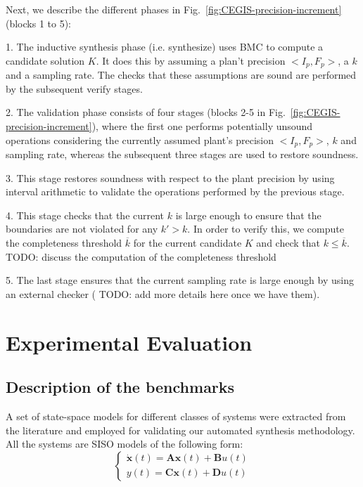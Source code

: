 \documentclass[runningheads,a4paper]{llncs}
\newcommand{\todo}[1]{{\color{red} TODO: #1}}
\begin{document}
Next, we describe the different phases in Fig.~\ref{fig:CEGIS-precision-increment}
(blocks 1 to 5):

1. The inductive synthesis phase (i.e. {\sc synthesize}) uses BMC to
compute a candidate solution $K$. It does this by assuming a plan't
precision $<I_p,F_p>$, a $k$ and a sampling rate.  The checks that
these assumptions are sound are performed by the subsequent {\sc
  verify} stages.

2. The validation phase consists of four stages (blocks 2-5 in
Fig.~\ref{fig:CEGIS-precision-increment}), where the first one
performs potentially unsound operations considering the currently
assumed plant's precision $<I_p,F_p>$, $k$ and sampling rate, whereas
the subsequent three stages are used to restore soundness.

3. This stage restores soundness with respect to the plant precision
by using interval arithmetic \cite{moore1966interval} to validate the 
operations performed by the previous stage.

4. This stage checks that the current  $k$ 
is large enough to ensure that the boundaries are not violated for any $k'>k$.
In order to verify this, we compute the 
completeness threshold $\overline{k}$ for the current candidate $K$ 
and check that $k{\leq}\overline{k}$. 
\todo{discuss the computation of the completeness threshold}

5. The last stage ensures that the current sampling rate is large enough by using an 
external checker (\todo{add more details here once we have them}).


\section{Experimental Evaluation}


\subsection{Description of the benchmarks}

A set of state-space models for different classes of 
systems were extracted from the literature and employed 
for validating our automated synthesis methodology. 
All the systems are SISO models of the following form:
%
\begin{equation}
\left\lbrace\begin{array}{c}
\dot{\textbf{x}}(t)=\textbf{A}\textbf{x}(t)+\textbf{B}u(t)\\
y(t)=\textbf{C}\textbf{x}(t)+\textbf{D}u(t)
\end{array}\right.
\end{equation}
\end{document}
